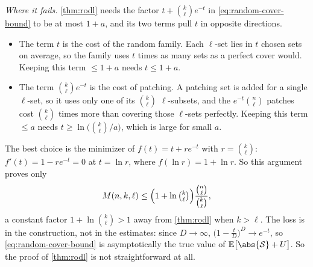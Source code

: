 \emph{Where it fails.} \autoref{thm:rodl} needs the factor \(t + \binom{k}{\ell} e^{-t}\) in \eqref{eq:random-cover-bound} to be at most \(1 + a\), and its two terms pull \(t\) in opposite directions.
\begin{itemize}
    \item The term \(t\) is the cost of the random family. Each \(\ell\)-set lies in \(t\) chosen sets on average, so the family uses \(t\) times as many sets as a perfect cover would. Keeping this term \(\le 1 + a\) needs \(t \le 1 + a\).
    \item The term \(\binom{k}{\ell} e^{-t}\) is the cost of patching. A patching set is added for a single \(\ell\)-set, so it uses only one of its \(\binom{k}{\ell}\) \(\ell\)-subsets, and the \(e^{-t}\binom{n}{\ell}\) patches cost \(\binom{k}{\ell}\) times more than covering those \(\ell\)-sets perfectly. Keeping this term \(\le a\) needs \(t \ge \ln \bigl( \binom{k}{\ell} / a \bigr)\), which is large for small \(a\).
\end{itemize}
The best choice is the minimizer of \(f(t) = t + r e^{-t}\) with \(r = \binom{k}{\ell}\): \(f'(t) = 1 - r e^{-t} = 0\) at \(t = \ln r\), where \(f(\ln r) = 1 + \ln r\). So this argument proves only
\[
    M(n,k,\ell) \le \Bigl( 1 + \ln \tbinom{k}{\ell} \Bigr) \frac{\binom{n}{\ell}}{\binom{k}{\ell}},
\]
a constant factor \(1 + \ln \binom{k}{\ell} > 1\) away from \autoref{thm:rodl} when \(k > \ell\). The loss is in the construction, not in the estimates: since \(D \to \infty\), \(\bigl( 1 - \frac{t}{D} \bigr)^{D} \to e^{-t}\), so \eqref{eq:random-cover-bound} is asymptotically the true value of \(\mathbb{E}\bigl[ \abs{\mathcal{S}} + U \bigr]\). So the proof of \autoref{thm:rodl} is not straightforward at all.

